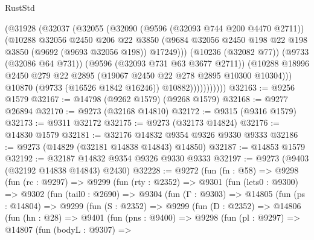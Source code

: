 \begin{lexlean}{RustStd}
\begin{coremodule}
{\begin{coremodule}
{{{{{{{{{{{{{{{{{{{{{{{{{{{{{{{{{{{{{{{{{{{{{{{{{{{{{{{                      (@31928
                        (@32037
                          (@32055
                            (@32090
                              (@9596 (@32093 @744 @200 @4470 @2711))
                              (@10288
                                @32056
                                @2450
                                @206
                                @22
                                @3850
                                (@9684
                                  @32056
                                  @2450
                                  @198
                                  @22
                                  @198
                                  @3850
                                  (@9692 (@9693 @32056 @198))
                                  @17249)))
                            (@10236 (@32082 @77))
                            (@9733 (@32086 @64 @731))
                            (@9596 (@32093 @731 @63 @3677 @2711))
                            (@10288
                              @18996
                              @2450
                              @279
                              @22
                              @2895
                              (@19067 @2450 @22 @278 @2895 @10300 @10304)))
                          @10870
                          (@9733 (@16526 @1842 @16246))
                          @10882)))))))))))
@32163 := @9256 @1579
@32167 := @14798 (@9262 @1579) (@9268 @1579)
@32168 := @9277 @26894
@32170 := @9273 (@32168 @14810)
@32172 := @9315 (@9316 @1579)
@32173 := @9311 @32172
@32175 := @9273 (@32173 @14824)
@32176 := @14830 @1579
@32181 := @32176 @14832 @9354 @9326 @9330 @9333
@32186 := @9273 (@14829 (@32181 @14838 @14843) @14850)
@32187 := @14853 @1579
@32192 := @32187 @14832 @9354 @9326 @9330 @9333
@32197 := @9273 (@9403 (@32192 @14838 @14843) @2430)
@32228 := @9272
    (fun (fn : @58) =>
    @9298
      (fun (rc : @9297) =>
      @9299
        (fun (rty : @2352) =>
        @9301
          (fun (lets0 : @9300) =>
          @9302
            (fun (tail0 : @2690) =>
            @9304
              (fun (Γ : @9303) =>
              @14805
                (fun (ps : @14804) =>
                @9299
                  (fun (S : @2352) =>
                  @9299
                    (fun (D : @2352) =>
                    @14806
                      (fun (hn : @28) =>
                      @9401
                        (fun (pns : @9400) =>
                        @9298
                          (fun (pl : @9297) =>
                          @14807
                            (fun (bodyL : @9307) =>
}}}}}}}}}}}}}}}}}}}}}}}}}}}}}}}}}}}}}}}}}}}}}}}}}}}}}}}
\end{coremodule}}
\end{coremodule}
\end{lexlean}
